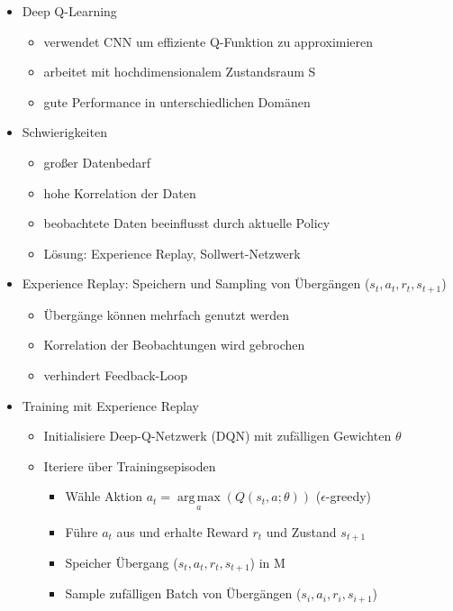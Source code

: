 \documentclass[paper=a4, fontsize=11pt]{scrartcl} %
\numberwithin{equation}{section} %
\numberwithin{figure}{section} %
\numberwithin{table}{section} %
\DeclareMathOperator*{\argmax}{arg\,max}
\begin{document}
\begin{itemize}
\item Deep Q-Learning
\begin{itemize}
\item verwendet CNN um effiziente Q-Funktion zu approximieren
\item arbeitet mit hochdimensionalem Zustandsraum S
\item gute Performance in unterschiedlichen Domänen
\end{itemize}
\item Schwierigkeiten
\begin{itemize}
\item großer Datenbedarf
\item hohe Korrelation der Daten
\item beobachtete Daten beeinflusst durch aktuelle Policy
\item Lösung: Experience Replay, Sollwert-Netzwerk
\end{itemize}
\item Experience Replay: Speichern und Sampling von Übergängen ($s_t,a_t,r_t,s_{t+1}$)
\begin{itemize}
\item Übergänge können mehrfach genutzt werden
\item Korrelation der Beobachtungen wird gebrochen
\item verhindert Feedback-Loop
\end{itemize}
\item Training mit Experience Replay
\begin{itemize}
\item Initialisiere Deep-Q-Netzwerk (DQN) mit zufälligen Gewichten $\theta$
\item Iteriere über Trainingsepisoden
\begin{itemize}
\item Wähle Aktion $a_t = \argmax\limits_a(Q(s_t,a;\theta))$ ($\epsilon$-greedy)
\item Führe $a_t$ aus und erhalte Reward $r_t$ und Zustand $s_{t+1}$
\item Speicher Übergang ($s_t,a_t,r_t,s_{t+1}$) in M
\item Sample zufälligen Batch von Übergängen ($s_i,a_i,r_i,s_{i+1}$)
\end{itemize}
\end{itemize}
\end{itemize}
\end{document}
